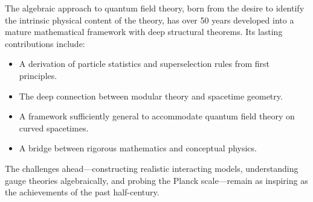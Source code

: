 \documentclass[11pt,a4paper]{article}
\begin{document}
The algebraic approach to quantum field theory, born from the desire to
identify the intrinsic physical content of the theory, has over 50 years
developed into a mature mathematical framework with deep structural
theorems. Its lasting contributions include:
\begin{itemize}[nosep]
  \item A derivation of particle statistics and superselection rules from
        first principles.
  \item The deep connection between modular theory and spacetime geometry.
  \item A framework sufficiently general to accommodate quantum field theory
        on curved spacetimes.
  \item A bridge between rigorous mathematics and conceptual physics.
\end{itemize}

The challenges ahead---constructing realistic interacting models, understanding
gauge theories algebraically, and probing the Planck scale---remain as
inspiring as the achievements of the past half-century.
\end{document}
